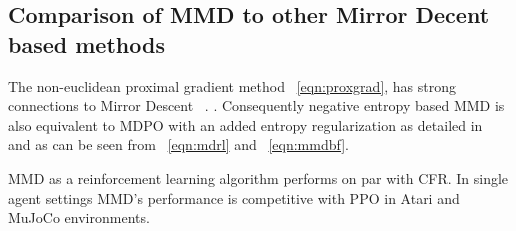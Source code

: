 \subsection{Comparison of MMD to other Mirror Decent based methods}

The non-euclidean proximal gradient method~ \ref{eqn:proxgrad}, has strong connections to Mirror
Descent~ \cite[Appendix D.3]{sokotaUnified2023}.
.
Consequently negative entropy based MMD is also equivalent to MDPO with an added entropy
regularization as detailed in~ \cite[Appendix L]{sokotaUnified2023} and as can be seen from~
\ref{eqn:mdrl} and~ \ref{eqn:mmdbf}.

MMD as a reinforcement learning algorithm performs on par with CFR.
In single agent settings MMD's performance is competitive with PPO in Atari and MuJoCo
environments.

